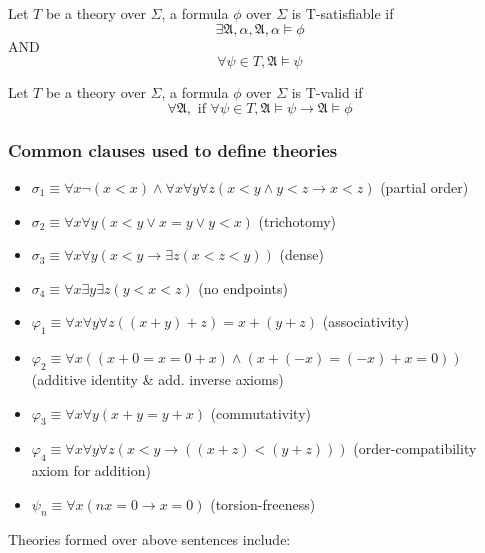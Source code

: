 \documentclass{article}
\newtheorem{definition}[theorem]{Definition}
\let\olddefinition\definition
\let\endolddefinition\enddefinition
\renewenvironment{definition}
  {\begin{tcolorbox}[
      colback=red!10,
      colframe=red!50!black,
      boxrule=0.6pt,
      arc=2pt,
      left=6pt,right=6pt,top=4pt,bottom=4pt,
      breakable
    ]\olddefinition}
  {\endolddefinition\end{tcolorbox}}
\begin{document}
\begin{definition}[T-satisfiable]
    Let $T$ be a theory over $\Sigma$, a formula $\phi$ over $\Sigma$ is T-satisfiable if 
    \[\exists \mathfrak{A}, \alpha, \mathfrak{A}, \alpha \models \phi\]
    AND
    \[\forall \psi \in T, \mathfrak{A} \models \psi\]
\end{definition}
\begin{definition}[T-validity]
    Let $T$ be a theory over $\Sigma$, a formula $\phi$ over $\Sigma$ is T-valid if 
    \[\forall \mathfrak{A}, \text{ if } \forall \psi \in T, \mathfrak{A} \models \psi \rightarrow \mathfrak{A} \models \phi\]
\end{definition}

\subsubsection{Common clauses used to define theories}
\begin{itemize}
    \item $\sigma_1 \equiv \forall x \neg(x < x) \land \forall x\forall y \forall z (x<y \land y<z \rightarrow x<z)$ (partial order)
    \item $\sigma_2 \equiv \forall x\forall y (x<y \lor x = y \lor y < x)$ (trichotomy)
    \item $\sigma_3 \equiv \forall x \forall y(x < y \rightarrow \exists z(x < z< y))$ (dense)
    \item $\sigma_4 \equiv \forall x \exists y \exists z (y < x < z)$ (no endpoints)
    \item $\varphi_1 \equiv \forall x \forall y \forall z ((x + y) + z) = x + (y + z)$ (associativity)
    \item $\varphi_2 \equiv \forall x ((x + 0 = x = 0 + x) \land (x + (-x) = (-x) + x = 0))$ (additive identity \& add. inverse axioms)
    \item $\varphi_3 \equiv \forall x \forall y (x + y = y + x)$ (commutativity)
    \item $\varphi_4 \equiv \forall x \forall y \forall z (x < y \rightarrow ((x + z) < (y + z)))$ (order-compatibility axiom for addition)
    \item $\psi_n \equiv \forall x (nx = 0 \rightarrow x = 0)$ (torsion-freeness)
\end{itemize}
Theories formed over above sentences include:
\end{document}
